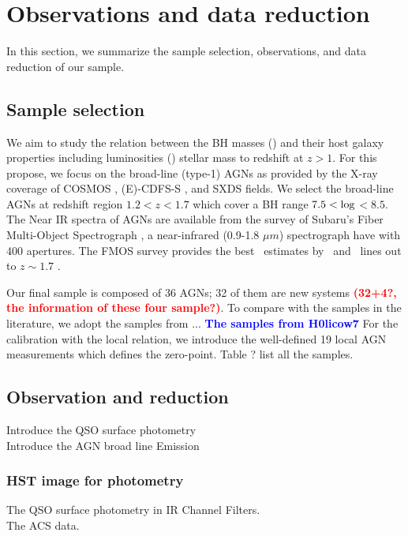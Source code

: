 \documentclass[apj]{emulateapj}
\begin{document}
\section{Observations and data reduction}
\label{sec:data}
In this section, we summarize the sample selection, observations, and data reduction of our sample. 

\subsection{Sample selection}

We aim to study the relation between the BH masses (\mbh) and their host galaxy properties including luminosities (\lhost) stellar mass to redshift at $z>1$. For this propose, we focus on the broad-line (type-1) AGNs as provided by the X-ray coverage of COSMOS \citep{Civano2016}, (E)-CDFS-S \citep{Lehmer2005, Xue2011}, and SXDS \citep{Ueda2008} fields. We select the broad-line AGNs at redshift region $1.2<z<1.7$ which cover a BH range $7.5<{\rm log}$\mbh $<8.5$. The Near IR spectra of AGNs are available from the survey of Subaru's Fiber Multi-Object Spectrograph \citep[FMOS, ][]{Kimura2010, Schulze2018}, a near-infrared (0.9-1.8 $\mu m$) spectrograph have with 400 apertures. The FMOS survey provides the best \mbh\ estimates by \halpha\ and \hbeta\ lines out to $z\sim1.7$ \citep{Greene2005, Matsuoka2013, Nobuta2012}.

Our final sample is composed of 36  AGNs; 32 of them are new systems \textcolor{red}{\bf (32+4?, the information of these four sample?)}. To compare with the samples in the literature, we adopt the samples from ... \textcolor{blue}{\bf The samples from H0licow7}
For the calibration with the local relation, we introduce the well-defined 19 local AGN measurements \citep{Ben++10, Peterson2004} which defines the zero-point. Table ? list all the samples.

\subsection{Observation and reduction}
\label{observation}
Introduce the QSO surface photometry\\
Introduce the AGN broad line Emission

\subsubsection{HST image for photometry}
The QSO surface photometry in IR Channel Filters.\\
The ACS data.
\end{document}
